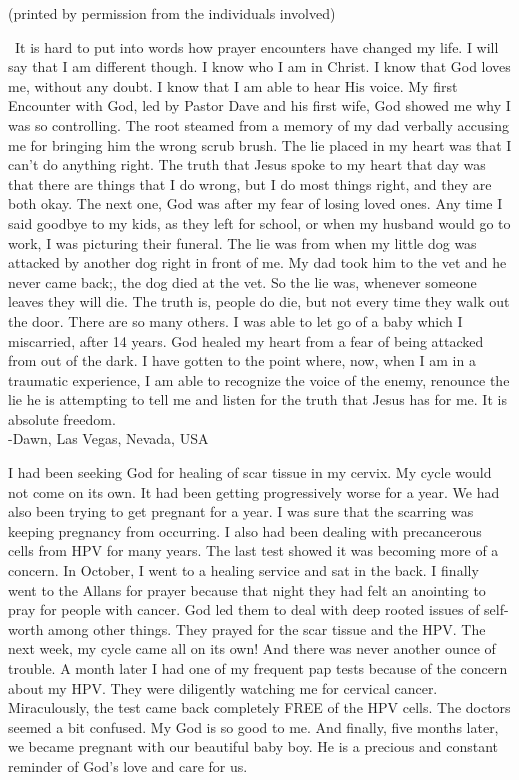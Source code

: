 \documentclass[twoside, 12pt]{book}
\begin{document}
\begin{center}
\small{(printed by permission from the individuals involved)}
\end{center}
\
It is hard to put into words how prayer encounters have changed my life. I will say that I am different though.  I know who I am in Christ. I know that God loves me, without any doubt.  I know that I am able to hear His voice.
My first Encounter with God, led by Pastor Dave and his first wife, God showed me why I was so controlling. The root steamed from a memory of my dad verbally accusing me for bringing him the wrong scrub brush. The lie placed in my heart was that I can't do anything right. The truth that Jesus spoke to my heart that day was that there are things that I do wrong, but I do most things right, and they are both okay.
The next one, God was after my fear of losing loved ones. Any time I said goodbye to my kids, as they left for school, or when my husband would go to work, I was picturing their funeral. The lie was from when my little dog was attacked by another dog right in front of me. My dad took him to the vet and he never came back;, the dog died at the vet. So the lie was, whenever someone leaves they will die. The truth is, people do die, but not every time they walk out the door.
There are so many others.  I was able to let go of a baby which I miscarried, after 14 years.
God healed my heart from a fear of being attacked from out of the dark.
I have gotten to the point where, now, when I am in a traumatic experience,  I am able to recognize the voice of the enemy, renounce the lie he is attempting to tell me and listen for the truth that Jesus has for me. It is absolute  freedom.\\

-Dawn, Las Vegas, Nevada, USA	

\clearpage

I had been seeking God for healing of scar tissue in my cervix. My cycle would not come on its own. It had been getting progressively worse for a year. We had also been trying to get pregnant for a year. I was sure that the scarring was keeping pregnancy from occurring. I also had been dealing with precancerous cells from HPV for many years. The last test showed it was becoming more of a concern.
In October, I went to a healing service and sat in the back. I finally went to the Allans for prayer because that night they had felt an anointing to pray for people with cancer. God led them to deal with deep rooted issues of self-worth among other things. They prayed for the scar tissue and the HPV.
The next week, my cycle came all on its own! And there was never another ounce of trouble. A month later I had one of my frequent pap tests because of the concern about my HPV. They were diligently watching me for cervical cancer. Miraculously, the test came back  completely FREE of the HPV cells. The doctors seemed a bit confused. My God is so good to me.
And finally, five months later, we became pregnant with our beautiful baby boy. He is a precious and constant reminder of God's love and care for us. \\
\end{document}

